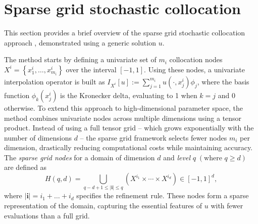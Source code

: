 \section{Sparse grid stochastic collocation}\label{sec:SC}
This section provides a brief overview of the sparse grid stochastic collocation approach \cite{BaNoRi:2000, KlBa:2005, MaNi:2009, Sm:1963}, demonstrated using a generic solution $u$. 

The method starts by defining a univariate set of $m_i$ collocation nodes $X^i = \left\{x_1^i,\ldots, x_{m_i}^i\right\}$ over the interval $[-1,1]$. Using these nodes, a univariate interpolation operator is built as $I_{X^{i}}[u]:=\sum_{j=1}^{m_{i}} u(\cdot, x_j^i)\phi_j$, where the basis function $\phi_k(x_j^i)$ is the Kronecker delta, evaluating to 1 when $k=j$ and $0$ otherwise. To extend this approach to high-dimensional parameter space, the method combines univariate nodes across multiple dimensions using a tensor product. Instead of using a full tensor grid -- which grows exponentially with the number of dimensions $d$ -- the sparse grid framework selects fewer nodes $m_i$ per dimension, drastically reducing computational costs while maintaining accuracy. The {\it sparse grid nodes} for a domain of dimension $d$ and {\it level} $q\; (\text{where }q\ge d)$ are defined as
%
\begin{equation*}
H(q,d) = \bigcup_{q-d+1\le|\boldsymbol{i}|\le q} \left(X^{i_1}\times \cdots\times X^{i_d}\right)\in [-1,1]^d, 
\end{equation*}
where $|\boldsymbol{i}| = i_1+\ldots+i_d$ specifies the refinement rule. These nodes form a sparse representation of the domain, capturing the essential features of $u$ with fewer evaluations than a full grid. 


